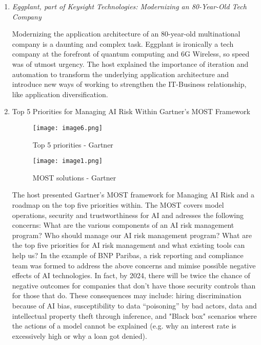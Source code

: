 \begin{enumerate}
    \item \color{dgreen} \textit{Eggplant, part of Keysight Technologies: Modernizing an 80-Year-Old Tech Company}
    
    \color{black} Modernizing the application architecture of an 80-year-old multinational company is a daunting and complex task. Eggplant is ironically a tech company at the forefront of quantum computing and 6G Wireless, so speed was of utmost urgency. The host explained the importance of iteration and automation to transform the underlying application architecture and introduce new ways of working to strengthen the IT-Business relationship, like application diversification.

    \item \color{dgreen} Top 5 Priorities for Managing AI Risk Within Gartner’s MOST Framework

    \begin{figure}[H]
        \centering
        \begin{minipage}[b]{0.49\textwidth}
          \texttt{[image: image6.png]}
          \caption*{Top 5 priorities - Gartner}
        \end{minipage}
        \hfill
        \begin{minipage}[b]{0.49\textwidth}
          \texttt{[image: image1.png]}
          \caption*{MOST solutions - Gartner}
        \end{minipage}
    \end{figure}
    
    \color{black} The host presented Gartner's MOST framework for Managing AI Risk and a roadmap on the top five priorities within. The MOST covers model operations, security and trustworthiness for AI and adresses the following concerns: What are the various components of an AI risk management program? Who should manage our AI risk management program? What are the top five priorities for AI risk management and what existing tools can help us? In the example of BNP Paribas, a risk reporting and compliance team was formed to address the above concerns and mimise possible negative effects of AI technologies. In fact, by 2024, there will be twice the chance of negative outcomes for companies that don't have those security controls than for those that do. These consequences may include: hiring discrimination because of AI bias, susceptibility to data “poisoning” by bad actors, data and intellectual property theft through inference, and "Black box" scenarios where the actions of a model cannot be explained (e.g. why an interest rate is excessively high or why a loan got denied).


\end{enumerate}
